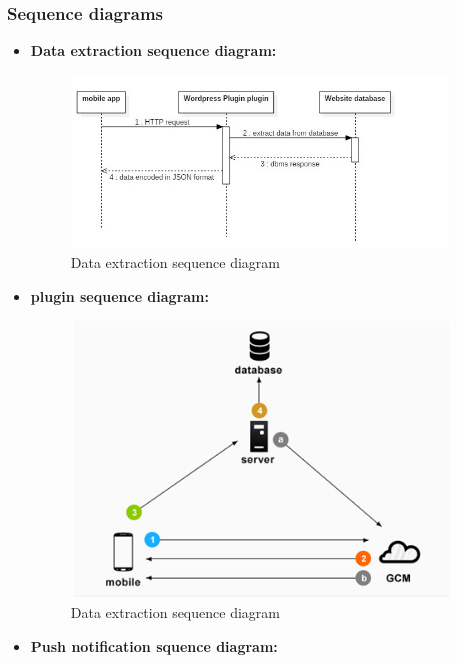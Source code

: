 \subsubsection{Sequence diagrams}
\begin{itemize}
\item \textbf{Data extraction sequence diagram:}
 	 	
\begin{figure}[H]
 \includegraphics[width=10cm]{sequence2.jpg}
 \caption{Data extraction sequence diagram}
	\label{Data extraction sequence diagram}
\centering
\end{figure}
	
\item \textbf{plugin sequence diagram:}
\begin{figure}[H]
 \includegraphics[width=10cm]{sequence1.png}
 \caption{Data extraction sequence diagram}
	\label{Data extraction sequence diagram}
\centering
\end{figure}
\item \textbf{Push notification squence diagram:}


\end{itemize}
